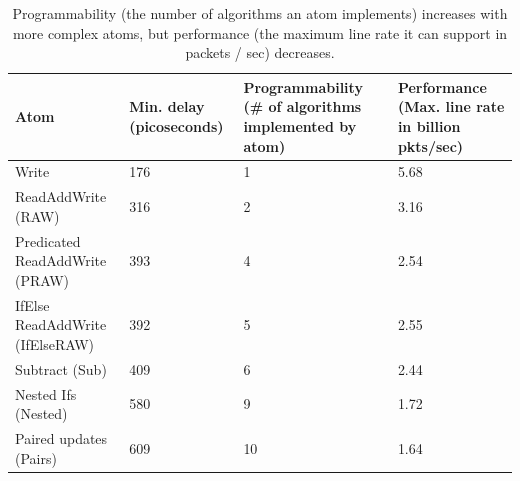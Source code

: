 \begin{table}[!t]
  \begin{scriptsize}
  \begin{tabular}{|p{}|p{}|p{}|p{}|}
  \hline
  Atom & Min. delay (picoseconds) & Programmability (\# of algorithms implemented by atom) & Performance (Max. line rate in billion pkts/sec) \\
  \hline
  Write & 176 & 1  & 5.68 \\
  \hline
  ReadAddWrite (RAW) & 316 & 2 & 3.16\\
  \hline
  \pbox{0.1\textwidth}
  {Predicated\\
  ReadAddWrite (PRAW)} & 393 & 4 & 2.54 \\
  \hline
  IfElse ReadAddWrite (IfElseRAW) & 392 & 5 & 2.55 \\
  \hline
  Subtract (Sub) & 409 & 6 & 2.44 \\
  \hline
  Nested Ifs (Nested) & 580 & 9 & 1.72 \\
  \hline
  Paired updates (Pairs) & 609 & 10 & 1.64 \\
  \hline
  \end{tabular}
\end{scriptsize}
\caption{Programmability (the number of algorithms an atom implements)
increases with more complex atoms, but performance (the maximum line rate it
can support in packets / sec) decreases.}
\label{tab:perfprog}
\end{table}

